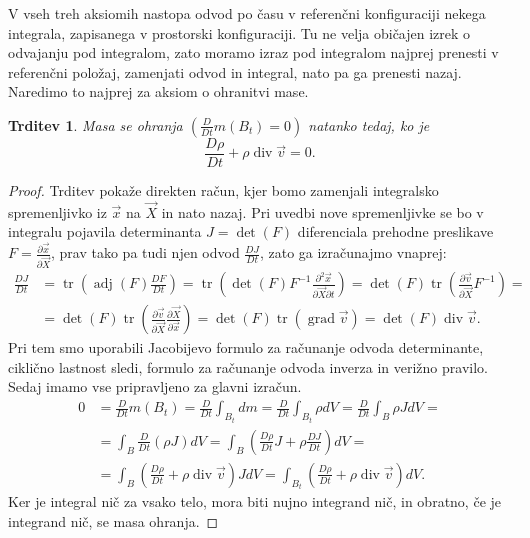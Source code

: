 \documentclass[12pt,a4paper,twoside]{article}
\theoremstyle{definition} %
\theoremstyle{plain} %
\newtheorem{trditev}[definicija]{Trditev}
\numberwithin{equation}{section}
\renewcommand{\div}{\operatorname{div}}
\newcommand{\grad}{\operatorname{grad}}
\newcommand{\dpar}[2]{\ensuremath{\frac{\partial #1}{\partial #2}}}
\newcommand{\DD}[2]{\ensuremath{\frac{D #1}{D #2}}}
\newcommand{\DDt}[1]{\DD{#1}{t}}
\newcommand{\vv}{\vec{v}}
\newcommand{\vX}{\vec{X}}
\newcommand{\vx}{\vec{x}}
\DeclareMathOperator{\tr}{tr}
\begin{document}
V vseh treh aksiomih nastopa odvod po času v referenčni konfiguraciji nekega
integrala, zapisanega v prostorski konfiguraciji. Tu ne velja običajen izrek o
odvajanju pod integralom, zato moramo izraz pod integralom najprej prenesti v
referenčni položaj, zamenjati odvod in integral, nato pa ga prenesti nazaj.
Naredimo to najprej za aksiom o ohranitvi mase.
\begin{trditev} Masa se ohranja $(\DDt{}m(B_t) = 0)$ natanko tedaj, ko je
  \begin{equation}
    \DDt\rho + \rho\div\vv = 0.
    \label{eq:ohr-masa}
  \end{equation}
\end{trditev}
\begin{proof}
Trditev pokaže direkten račun, kjer bomo zamenjali integralsko spremenljivko iz
$\vx$ na $\vX$ in nato nazaj. Pri uvedbi nove spremenljivke se bo v integralu
pojavila determinanta $J = \det(F)$ diferenciala prehodne preslikave $F =
\dpar{\vx}{\vX}$, prav tako pa tudi njen odvod $\DDt{J}$, zato ga izračunajmo vnaprej:
\begin{align*}
  \DDt J &= \tr\left(\operatorname{adj}(F) \DDt{F}\right) =
  \tr\left(\det(F)F^{-1} \dpar{^2\vx}{\vX\partial t}\right) =
  \det(F)\tr\left(\dpar{\vv}{\vX}F^{-1}\right) = \\ &=
  \det(F)\tr\left(\dpar{\vv}{\vX}\dpar{\vX}{\vx}\right) =
  \det(F)\tr\left(\grad \vv\right) =
  \det(F)\div \vv.
\end{align*}
Pri tem smo uporabili Jacobijevo formulo za računanje odvoda
determinante, ciklično lastnost sledi, formulo za računanje odvoda inverza in verižno pravilo.
Sedaj imamo vse pripravljeno za glavni izračun.
\begin{align*}
  0 &= \DDt{}m(B_t) =
  \DDt{} \int_{B_t} dm =
  \DDt{} \int_{B_t} \rho dV =
  \DDt{} \int_{B} \rho J dV =\\ &=
  \int_{B} \DDt{}(\rho J) dV =
  \int_{B}\left( \DDt{\rho} J + \rho \DDt{J} \right)dV = \\ &=
  \int_{B}\left( \DDt{\rho}  + \rho \div\vv\right) J dV =
  \int_{B_t}\left( \DDt{\rho}  + \rho \div\vv\right) dV.
\end{align*}
Ker je integral nič za vsako telo, mora biti nujno integrand nič, in obratno, če
je integrand nič, se masa ohranja.
\end{proof}
\end{document}
